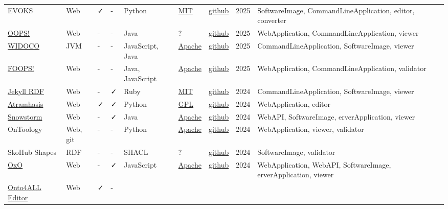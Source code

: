 \documentclass[
  DIV=10]{article}
\begin{document}
\begin{longtable}[]{@{}lllllllll@{}}
EVOKS & Web & ✓ & - & Python & \href{https://spdx.org/licenses/MIT}{MIT}
& \href{https://github.com/kit-data-manager/EVOKS}{github} & 2025 &
SoftwareImage, CommandLineApplication, editor, converter \\
\href{https://oops.linkeddata.es/}{OOPS!} & Web & - & - & Java & ? &
\href{https://github.com/oeg-upm/OOPS}{github} & 2025 & WebApplication,
CommandLineApplication, viewer \\
\href{https://github.com/dgarijo/Widoco}{WIDOCO} & JVM & - & - &
JavaScript, Java & \href{https://spdx.org/licenses/Apache-2.0}{Apache} &
\href{https://github.com/dgarijo/Widoco}{github} & 2025 &
CommandLineApplication, SoftwareImage, viewer \\
\href{https://foops.linkeddata.es/FAIR_validator.html}{FOOPS!} & Web & -
& - & Java, JavaScript &
\href{https://spdx.org/licenses/Apache-2.0}{Apache} &
\href{https://github.com/oeg-upm/fair_ontologies}{github} & 2025 &
WebApplication, CommandLineApplication, validator \\
\href{https://github.com/AKSW/jekyll-rdf}{Jekyll RDF} & Web & - & ✓ &
Ruby & \href{https://spdx.org/licenses/MIT}{MIT} &
\href{https://github.com/AKSW/jekyll-rdf}{github} & 2024 &
CommandLineApplication, SoftwareImage, viewer \\
\href{https://atramhasis.readthedocs.io/en/latest/}{Atramhasis} & Web &
✓ & ✓ & Python & \href{https://spdx.org/licenses/GPL-3.0-or-later}{GPL}
& \href{https://github.com/OnroerendErfgoed/atramhasis}{github} & 2024 &
WebApplication, editor \\
\href{https://github.com/IHTSDO/snowstorm}{Snowstorm} & Web & - & ✓ &
Java & \href{https://spdx.org/licenses/Apache-2.0}{Apache} &
\href{https://github.com/IHTSDO/snowstorm}{github} & 2024 & WebAPI,
SoftwareImage, erverApplication, viewer \\
OnToology & Web, git & - & - & Python &
\href{https://spdx.org/licenses/Apache-2.0}{Apache} &
\href{https://github.com/OnToology/OnToology}{github} & 2024 &
WebApplication, viewer, validator \\
SkoHub Shapes & RDF & - & - & SHACL & ? &
\href{https://github.com/skohub-io/skohub-shapes}{github} & 2024 &
SoftwareImage, validator \\
\href{https://www.ebi.ac.uk/spot/oxo/}{OxO} & Web & - & ✓ & JavaScript &
\href{https://spdx.org/licenses/Apache-2.0}{Apache} &
\href{https://github.com/EBISPOT/OXO}{github} & 2024 & WebApplication,
WebAPI, SoftwareImage, erverApplication, viewer \\
\href{https://onto4all.com/}{Onto4ALL Editor} & Web & ✓ & - &

\end{longtable}
\end{document}
